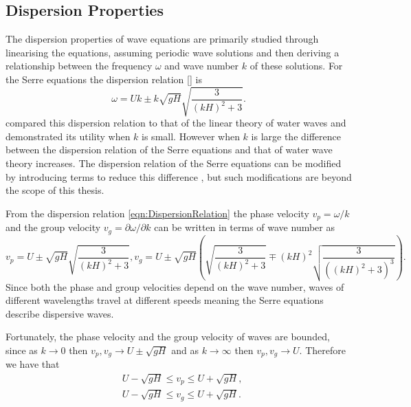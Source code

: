 \subsection{Dispersion Properties}
The dispersion properties of wave equations are primarily studied through linearising the equations, assuming periodic wave solutions and then deriving a relationship between the frequency $\omega$ and wave number $k$ of these solutions. For the Serre equations the dispersion relation [] is
\begin{equation}
\label{eqn:DispersionRelation}
\omega = Uk \pm k \sqrt{gH} \sqrt{\frac{3}{\left(kH\right)^2 + 3}}.
\end{equation}
\citet{Barthelemy-2004-315} compared this dispersion relation to that of the linear theory of water waves and demonstrated its utility when $k$ is small. However when $k$ is large the difference between the dispersion relation of the Serre equations and that of water wave theory increases. The dispersion relation of the Serre equations can be modified by introducing terms to reduce this difference \cite{Barthelemy-2004-315}, but such modifications are beyond the scope of this thesis.


From the dispersion relation \eqref{eqn:DispersionRelation} the phase velocity $v_p = \omega / k$  and the group velocity $v_g = \partial \omega / \partial  k$ can be written in terms of wave number as
\begin{subequations}
	\label{eqn:WaveVelocities}
	\begin{equation}
	\label{eqn:WaveVelocitiesPhase}
	v_p = U \pm \sqrt{gH}\sqrt{\frac{3}{\left(kH\right)^2 + 3}},
	\end{equation}
	\begin{equation}
	\label{eqn:WaveVelocitiesGroup}
	v_g = U \pm \sqrt{gH} \left(\sqrt{\frac{3}{\left(kH\right)^2 + 3}} \mp \left(kH\right)^2 \sqrt{\frac{3}{\left(\left(kH\right)^2 + 3 \right)^3}}\right).
	\end{equation}
\end{subequations}
Since both the phase and group velocities depend on the wave number, waves of different wavelengths travel at different speeds meaning the Serre equations describe dispersive waves.

Fortunately, the phase velocity and the group velocity of waves are bounded, since as $k \rightarrow 0$ then $v_p,v_g \rightarrow U \pm \sqrt{gH}$ and as $k \rightarrow \infty$ then  $v_p,v_g \rightarrow U$. Therefore we have that
\begin{subequations}
\begin{align}
&U - \sqrt{gH} \le v_p \le U + \sqrt{gH}, \label{eqn:WaveVelocitiesBound} \\
&U - \sqrt{gH} \le v_g \le U + \sqrt{gH}.
\end{align}
\end{subequations}

